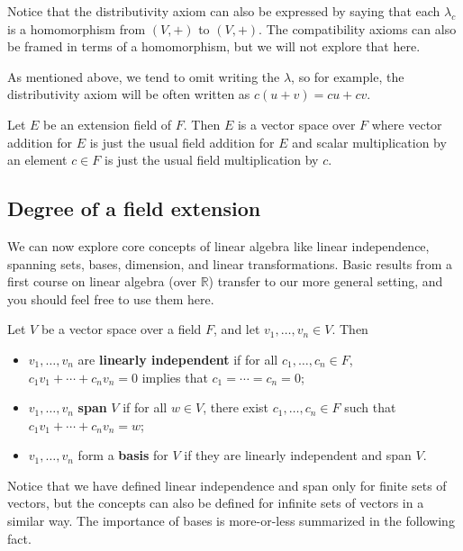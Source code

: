 Notice that the distributivity axiom can also be expressed by saying that each $\lambda_c$ is a homomorphism from $(V,+)$ to $(V,+)$. The compatibility axioms can also be framed in terms of a homomorphism, but we will not explore that here.

As mentioned above, we tend to omit writing the $\lambda$, so for example, the distributivity axiom will be often written as $c(u+v) = cu+cv$.

\begin{theorem}\label{thm.ExtensionFieldVectorSpace}
Let $E$ be an extension field of $F$. Then $E$ is a vector space over $F$ where vector addition for $E$ is  just the usual field addition for $E$ and scalar multiplication by an element $c\in F$ is just the usual field multiplication by $c$.
\end{theorem}

\subsection{Degree of a field extension}
We can now explore core concepts of linear algebra like linear independence, spanning sets, bases, dimension, and linear transformations. Basic results from a first course on linear algebra (over $\mathbb{R}$) transfer to our more general setting, and you should feel free to use them here. 

\begin{definition}
Let $V$ be a vector space over a field $F$, and let $v_1, \ldots,v_n\in V$. Then
\begin{itemize}
\item $v_1, \ldots,v_n$ are \textbf{linearly independent} if for all $c_1, \ldots,c_n\in F$, $c_1v_1+ \cdots + c_nv_n = 0$ implies that $c_1  = \cdots = c_n = 0$; 
\item $v_1, \ldots,v_n$ \textbf{span} $V$ if for all $w\in V$, there exist $c_1,  \ldots,c_n\in F$ such that $c_1v_1+ \cdots + c_nv_n = w$;
\item $v_1, \ldots,v_n$ form a \textbf{basis} for $V$ if they are linearly independent and span $V$.
\end{itemize}
\end{definition}

Notice that we have defined linear independence and span only for finite sets of vectors, but the concepts can also be defined for infinite sets of vectors in a similar way. The importance of bases is more-or-less summarized in the following fact.

